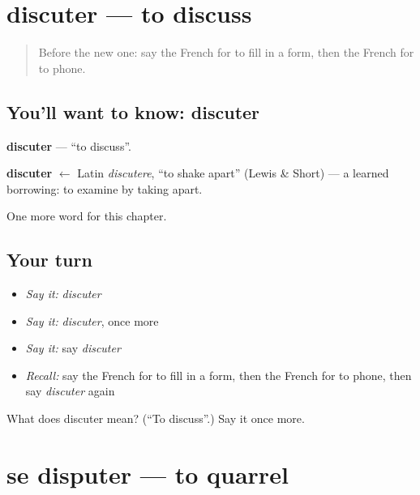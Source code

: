 \section[discuter]{discuter — to discuss}

\label{lesson:FR-C145-discuter}



\begin{quote}
Before the new one: say the French for to fill in a form, then the French for to phone.
\end{quote}

\subsection*{You'll want to know: discuter}
\textbf{discuter} — \textquotedblleft{}to discuss\textquotedblright{}.

\begin{cousinweb}
\textbf{discuter} $\leftarrow$ Latin \emph{discutere}, \textquotedblleft{}to shake apart\textquotedblright{} (Lewis \& Short) — a learned borrowing: to examine by taking apart.
\end{cousinweb}

\begin{grammarlens}[title={What you've built}]
One more word for this chapter.
\end{grammarlens}

\subsection*{Your turn}
\begin{itemize}
\raggedright
  \item \emph{Say it:} \emph{discuter}
  \item \emph{Say it:} \emph{discuter}, once more
  \item \emph{Say it:} say \emph{discuter}
  \item \emph{Recall:} say the French for to fill in a form, then the French for to phone, then say \emph{discuter} again
\end{itemize}

\begin{tcolorbox}[breakable,colback=teal!4,colframe=teal!35!black,title={Before you move on}]
What does discuter mean? (\textquotedblleft{}To discuss\textquotedblright{}.) Say it once more.
\end{tcolorbox}
\section[se disputer]{se disputer — to quarrel}

